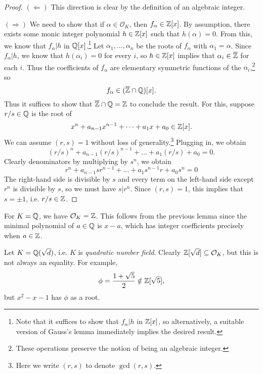 \begin{proof}
  $(\Leftarrow)$ This direction is clear by the
  definition of an algebraic integer.

  $(\Rightarrow)$ We need to show that if
  $\alpha \in \mathcal{O}_K$, then $f_\alpha \in \mathbb{Z}[x]$.
  By assumption, there exists some monic integer
  polynomial $h \in \mathbb{Z}[x]$ such that $h(\alpha) = 0$.
  From this, we know that $f_\alpha | h$ in
  $\mathbb{Q}[x]$.\footnote{Note that it suffices to show that $f_\alpha | h$ in $\mathbb{Z}[x]$, so alternatively, a suitable version of Gauss's lemma immediately implies the desired result.}
  Let $\alpha_1, \dots, \alpha_n$ be the roots of
  $f_\alpha$ with $\alpha_1 = \alpha$. Since
  $f_\alpha | h$, we know that
  $h(\alpha_i) = 0$ for every $i$, so $h \in \mathbb{Z}[x]$
  implies that $\alpha_i \in \overline{\mathbb{Z}}$ for each $i$.
  Thus the coefficients of $f_\alpha$ are elementary
  symmetric functions of the $\alpha_i$,\footnote{These operations preserve the notion of being an algebraic integer.} so
  \[
    f_\alpha \in (\overline{\mathbb{Z}} \cap \mathbb{Q})[x].
  \]
  Thus it suffices to show that $\overline{\mathbb{Z}} \cap \mathbb{Q} = \mathbb{Z}$ to conclude the result.
  For this, suppose $r / s \in \mathbb{Q}$ is the root of
  \[
    x^n + a_{n-1} x^{n-1} + \dots + a_1 x + a_0 \in \mathbb{Z}[x].
  \]
  We can assume $(r, s) = 1$ without loss of generality.\footnote{Here we write $(r, s)$ to denote $\gcd(r, s)$.}
  Plugging in, we obtain
  \[
    (r / s)^n + a_{n-1} (r / s)^{n-1} + \dots + a_1 (r / s) + a_0 = 0.
  \]
  Clearly denominators by multiplying by $s^n$, we
  obtain
  \[
    r^n + a_{n - 1} sr^{n - 1} + \dots + a_1 s^{n - 1} r + a_0 s^n = 0
  \]
  The right-hand side is divisible by $s$ and every
  term on the left-hand side except $r^n$ is divisible
  by $s$, so we must have $s | r^n$. Since $(r, s) = 1$,
  this implies that $s = \pm 1$, i.e. $r / s \in \mathbb{Z}$.
\end{proof}

\begin{example}
  For $K = \mathbb{Q}$, we have $\mathcal{O}_K = \mathbb{Z}$. This
  follows from the previous lemma since
  the minimal polynomial of $a \in \mathbb{Q}$ is $x - a$, which
  has integer coefficients precisely when $a \in \mathbb{Z}$.
\end{example}

\begin{example}
  Let $K = \mathbb{Q}(\sqrt{d})$, i.e. $K$ is \emph{quadratic number field}.
  Clearly $\mathbb{Z}[\sqrt{d}] \subseteq \mathcal{O}_K$,
  but this is not always an equality. For example,
  \[
    \phi = \frac{1 + \sqrt{5}}{2} \notin \mathbb{Z}[\sqrt{5}],
  \]
  but $x^2 - x - 1$ has $\phi$ as a root.
\end{example}

